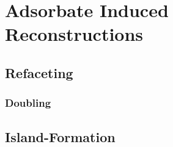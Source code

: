 \section{Adsorbate Induced Reconstructions}


\subsection{Refaceting}
\subsubsection{Doubling}
\subsection{Island-Formation}


%
